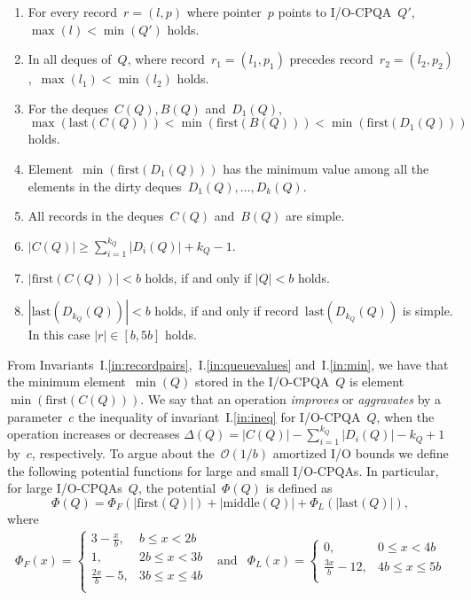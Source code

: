 \documentclass[]{article}
\newcommand{\first}{\text{first}}
\newcommand{\midd}{\text{middle}}
\newcommand{\last}{\text{last}}
\newcommand{\bigO}{\mathcal{O}}
\newcommand{\iref}[1]{I.\ref{#1}}
\begin{document}
\begin{enumerate}[{I}.1)]
  \item \label{in:records} For every record~$r = (l,p)$ where pointer~$p$ points
    to I/O-CPQA~$Q'$,~$\max(l) < \min(Q')$ holds.
  
  \item \label{in:recordpairs} In all deques of~$Q$, where
    record~$r_1=(l_1,p_1)$ precedes record~$r_2=(l_2,p_2)$,~$\max(l_1) <
    \min(l_2)$ holds.

  \item \label{in:queuevalues} For the deques~$C(Q),B(Q)$ and~$D_1(Q)$,
    $\max(\last(C(Q))) < \min(\first(B(Q))) < \min(\first(D_1(Q)))$ holds.

  \item \label{in:min} Element~$\min(\first(D_1(Q)))$ has the minimum value
    among all the elements in the dirty deques~$D_1(Q),\ldots,D_k(Q)$.

  \item \label{in:simple} All records in the deques~$C(Q)$ and~$B(Q)$ are
    simple.

  \item \label{in:ineq} $|C(Q)| \geq \sum_{i=1}^{k_Q}{|D_i(Q)|}+k_Q-1$.

  \item \label{in:small} $|\first(C(Q))|<b$ holds, if and only if $|Q|< b$
    holds.

  \item \label{in:smalltail} $|\last(D_{k_Q}(Q))|< b$ holds, if and only if
    record~$\last(D_{k_Q}(Q))$ is simple. In this case $|r|\in[b,5b]$ holds.
\end{enumerate}
From Invariants~\iref{in:recordpairs},~\iref{in:queuevalues} and~\iref{in:min},
we have that the minimum element~$\min(Q)$ stored in the I/O-CPQA~$Q$ is
element~$\min(\first(C(Q)))$. We say that an operation \textit{improves} or
\textit{aggravates} by a parameter~$c$ the inequality of
invariant~\iref{in:ineq} for I/O-CPQA~$Q$, when the operation increases or
decreases $\Delta (Q) = |C(Q)| - \sum_{i=1}^{k_Q}{|D_i(Q)|} - k_Q + 1$ by~$c$,
respectively. To argue about the~$\bigO(1/b)$ amortized I/O bounds we define the
following potential functions for large and small I/O-CPQAs. In particular, for
large I/O-CPQAs~$Q$, the potential~$\Phi(Q)$ is defined as
\[
  \Phi(Q) = \Phi_F(|\first(Q)|) + |\midd(Q)| + \Phi_L(|\last(Q)|),
\]
where 
\[
  \begin{array}{ccc}
    {
      \Phi_F(x) = \left\{
      \begin{array}{cl}
        3 -\frac{x}{b}, & b \leq x < 2b \\
        1, & 2b \leq x < 3b \\
        \frac{2x}{b}-5, & 3b \leq x \leq 4b \\
      \end{array}
    \right.
    } & \text{and} & {
    \Phi_L(x) = \left\{
      \begin{array}{cl}
        0, & 0 \leq x < 4b \\
        \frac{3x}{b}-12, & 4b \leq x \leq 5b \\
      \end{array}
    \right.
    }
  \end{array}
\]
\end{document}
